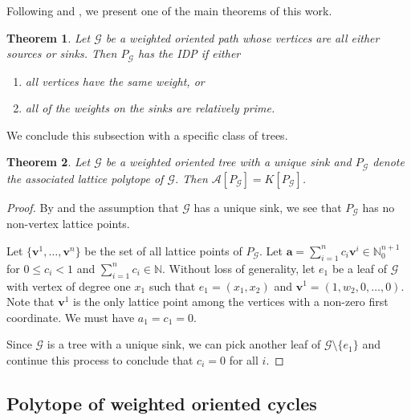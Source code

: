 \documentclass [12pt,a4paper,reqno]{amsart}
\theoremstyle{plain}
\newtheorem{Theorem}{Theorem}[section]
\theoremstyle{definition}
\newtheorem{Assumptions and Discussion}[Theorem]{Assumptions and Discussion}
\theoremstyle{remark}
\newcommand\calA{\mathcal{A}}
\newcommand\calG{\mathcal{G}}
\begin{document}
Following  and , we present one of the main theorems of this work.

\begin{Theorem}
    Let $\calG$ be a weighted oriented path whose vertices are all either sources or sinks.  Then $P_\calG$ has the IDP if either

\begin{enumerate}[a]
    \item all vertices have the same weight, or
    \item all of the weights on the sinks are relatively prime.
\end{enumerate}
\end{Theorem}


We conclude this subsection with a specific class of trees.


\begin{Theorem}
\label{sinkTree}Let $\calG$ be a weighted oriented tree with a unique
sink and $P_\calG$ denote the associated lattice polytope of $\calG$. Then $\calA[P_\calG]=K[P_\calG]$.
\end{Theorem}


\begin{proof}
By  and the assumption that $\mathcal{G}$ has a unique sink, we see that $P_{\mathcal{G}}$ has no non-vertex lattice points.

    Let $\{\mathbf{v}^1,\ldots, \mathbf{v}^n\}$ be the set of all lattice points of $P_\calG$. Let $\mathbf{a}=\sum_{i=1}^n c_{i}\mathbf{v}^{i} \in \mathbb{N}_0^{n+1}$ for $0\leq c_{i}<1$
and $\sum_{i=1}^{n}c_{i}\in\mathbb{N}$. Without loss of generality, let $e_1$ be a leaf of $\calG$ with vertex of degree one $x_1$ such that $e_1=(x_1,x_2)$ and  $\mathbf{v}^{1}=(1,w_2,0,\ldots,0)$.  Note that $\mathbf{v}^1$ is the only lattice point among the vertices with a non-zero first coordinate. We must have $a_1=c_1=0$.

Since $\calG$ is a tree with a unique sink, we can pick another leaf of $\calG\setminus \{e_1\}$ and continue this process to conclude that $c_i=0$ for all $i$.
\end{proof}








\subsection{Polytope of weighted oriented cycles}
\end{document}
